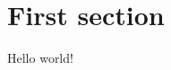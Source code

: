 \documentclass[12pt]{article}
\begin{document}
\section {First section}

Hello world!
\end{document}
